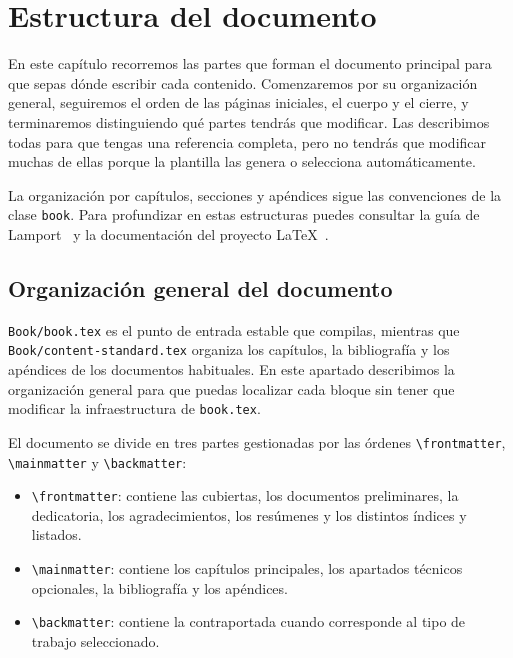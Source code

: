 %

\chapter{Estructura del documento}
\label{cha:estructura-documento}

En este capítulo recorremos las partes que forman el documento principal para que sepas dónde escribir cada contenido. Comenzaremos por su organización general, seguiremos el orden de las páginas iniciales, el cuerpo y el cierre, y terminaremos distinguiendo qué partes tendrás que modificar. Las describimos todas para que tengas una referencia completa, pero no tendrás que modificar muchas de ellas porque la plantilla las genera o selecciona automáticamente.

La organización por capítulos, secciones y apéndices sigue las convenciones de la clase \texttt{book}. Para profundizar en estas estructuras puedes consultar la guía de Lamport~\cite{lamport94} y la documentación del proyecto \LaTeX{}~\cite{latex-project-docs}.

\section{Organización general del documento}
\label{sec:estr-del-docum}

\texttt{Book/book.tex} es el punto de entrada estable que compilas, mientras que \texttt{Book/content-standard.tex} organiza los capítulos, la bibliografía y los apéndices de los documentos habituales. En este apartado describimos la organización general para que puedas localizar cada bloque sin tener que modificar la infraestructura de \texttt{book.tex}.

El documento se divide en tres partes gestionadas por las órdenes \texttt{\textbackslash{}frontmatter}, \texttt{\textbackslash{}mainmatter} y \texttt{\textbackslash{}backmatter}:

\begin{itemize}
  \item \texttt{\textbackslash{}frontmatter}: contiene las cubiertas, los documentos preliminares, la dedicatoria, los agradecimientos, los resúmenes y los distintos índices y listados.
  \item \texttt{\textbackslash{}mainmatter}: contiene los capítulos principales, los apartados técnicos opcionales, la bibliografía y los apéndices.
  \item \texttt{\textbackslash{}backmatter}: contiene la contraportada cuando corresponde al tipo de trabajo seleccionado.
\end{itemize}

